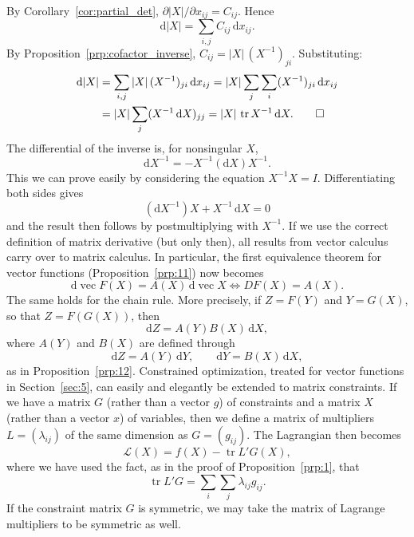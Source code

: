 \documentclass[12pt,a4paper]{article}
\makeatletter
\theoremstyle{definition}
\renewenvironment{proof}[1][\proofname]{\par
  \pushQED{\qed}%
  \normalfont \topsep6\p@\@plus6\p@\relax
  \trivlist
  \item[\hskip\labelsep\bfseries #1\@addpunct{.}]\ignorespaces
}{%
  \popQED\endtrivlist\@endpefalse
}
\DeclareMathOperator{\tr}{tr}
\DeclareMathOperator{\avec}{vec}
\newcommand{\dd}{\mathrm{d}}
\makeatother
\begin{document}
\begin{proof}[Proof of~\eqref{eq:30}]
By Corollary~\ref{cor:partial_det}, $\partial|X|/\partial x_{ij} = C_{ij}$. Hence
\[
\dd|X| = \sum_{i,j} C_{ij}\, \dd x_{ij}.
\]
By Proposition~\ref{prp:cofactor_inverse}, $C_{ij} = |X|\, (X^{-1})_{ji}$. Substituting:
\begin{align*}
\dd|X| &= \sum_{i,j} |X|\, (X^{-1})_{ji}\, \dd x_{ij}
= |X| \sum_{j} \sum_{i} (X^{-1})_{ji}\, \dd x_{ij} \\
&= |X| \sum_{j} (X^{-1}\, \dd X)_{jj}
= |X|\, \tr X^{-1}\, \dd X. \qedhere
\end{align*}
\end{proof}
The differential of the inverse is, for nonsingular $X$,
\begin{equation}\label{eq:32}
\dd X^{-1} = -X^{-1}(\dd X)X^{-1}.
\end{equation}
This we can prove easily by considering the equation $X^{-1}X = I$. Differentiating both sides gives
\[
(\dd X^{-1})X + X^{-1}\, \dd X = 0
\]
and the result then follows by postmultiplying with $X^{-1}$. If we use the correct definition of matrix derivative (but only then), all results from vector calculus carry over to matrix calculus. %
In particular, the first equivalence theorem for vector functions (Proposition~\ref{prp:11}) now becomes
\begin{equation}\label{eq:33}
\dd\avec F(X) = A(X)\, \dd\avec X \iff DF(X) = A(X).
\end{equation}
The same holds for the chain rule. More precisely, if $Z = F(Y)$ and $Y = G(X)$, so that $Z = F(G(X))$, then
\[
\dd Z = A(Y) B(X)\, \dd X,
\]
where $A(Y)$ and $B(X)$ are defined through
\[
\dd Z = A(Y)\, \dd Y, \qquad \dd Y = B(X)\, \dd X,
\]
as in Proposition~\ref{prp:12}. %
Constrained optimization, treated for vector functions in Section~\ref{sec:5}, can easily and elegantly be extended to matrix constraints. If we have a matrix $G$ (rather than a vector $g$) of constraints and a matrix $X$ (rather than a vector $x$) of variables, then we define a matrix of multipliers $L = (\lambda_{ij})$ of the same dimension as $G = (g_{ij})$. The Lagrangian then becomes
\begin{equation}\label{eq:34}
\mathcal{L}(X) = f(X) - \tr L'G(X),
\end{equation}
where we have used the fact, as in the proof of Proposition~\ref{prp:1}, that
\[
\tr L'G = \sum_i \sum_j \lambda_{ij} g_{ij}.
\]
If the constraint matrix $G$ is symmetric, we may take the matrix of Lagrange multipliers to be symmetric as well. %
\end{document}

